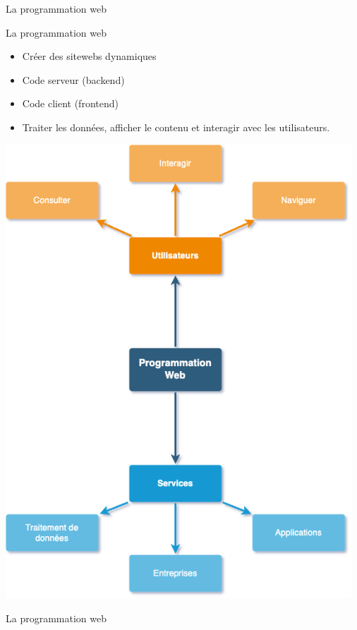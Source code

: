 \documentclass[
  ignorenonframetext,
]{beamer}
\providecommand{\tightlist}{%
  \setlength{\itemsep}{0pt}\setlength{\parskip}{0pt}}\usepackage{longtable,booktabs,array}
\begin{document}
\begin{frame}{La programmation web}
\label{la-programmation-web}
\begin{block}{La programmation web}
\label{la-programmation-web-1}
\begin{itemize}[<+->]
\tightlist
\item
  Créer des sitewebs dynamiques\\
\item
  Code serveur (backend)
\item
  Code client (frontend)
\item
  Traiter les données, afficher le contenu et interagir avec les
  utilisateurs.
\end{itemize}
\end{block}
\end{frame}

\begin{frame}
\includegraphics[width=5.10417in,height=\textheight]{./images/Overview_web_programming-Page-2.png}

\begin{block}{La programmation web}
\label{la-programmation-web-2}
\end{block}
\end{frame}
\end{document}

